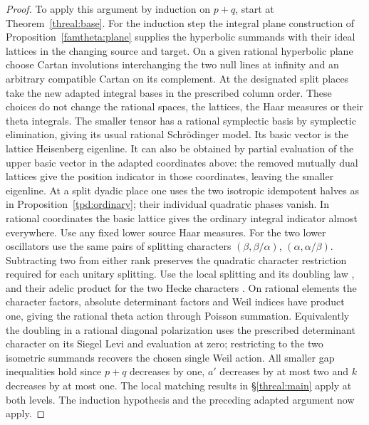 \begin{proof}
To apply this argument by induction on \(p+q\), start at
Theorem~\ref{threal:base}. For the induction step the integral
plane construction of Proposition~\ref{famtheta:plane} supplies
the hyperbolic summands with their ideal lattices in the changing
source and target. On a given rational hyperbolic plane choose
Cartan involutions interchanging the two null lines at infinity
and an arbitrary compatible Cartan on its complement. At the
designated split places take the new adapted integral bases in the
prescribed column order. These choices do not change the rational
spaces, the lattices, the Haar measures or their theta integrals.
The smaller tensor has a rational symplectic basis by symplectic
elimination, giving its usual rational Schr\"odinger model.
Its basic vector is the lattice Heisenberg eigenline. It can also
be obtained by partial evaluation of the upper basic vector in the
adapted coordinates above: the removed mutually dual lattices
give the position indicator in those coordinates, leaving the
smaller eigenline. At a split dyadic place one uses the two isotropic
idempotent halves as in Proposition~\ref{tpd:ordinary}; their
individual quadratic phases vanish. In rational coordinates the
basic lattice gives the ordinary integral indicator almost everywhere.
Use any fixed lower source Haar measures. For the two lower
oscillators use the same pairs of splitting characters
\((\beta,\beta/\alpha)\), \((\alpha,\alpha/\beta)\).
Subtracting two from either rank preserves the quadratic character
restriction required for each unitary splitting. Use the local
splitting and its doubling law
\cite[(1.16) and Proposition~2.2]{harrisKudlaSweet}, and their
adelic product for the two Hecke characters
\cite[\S\S2--3]{wuThetaTower}. On rational elements the character
factors, absolute determinant factors and Weil indices have product
one, giving the rational theta action through Poisson summation.
Equivalently the doubling in a rational diagonal polarization
uses the prescribed determinant character on its Siegel Levi
and evaluation at zero; restricting to the two isometric summands
recovers the chosen single Weil action. All smaller gap inequalities
hold since \(p+q\) decreases by one, \(a'\) decreases by at most
two and \(k\) decreases by at most one. The local matching results
in \S\ref{threal:main} apply at both levels. The induction
hypothesis and the preceding adapted argument now apply.


\end{proof}
